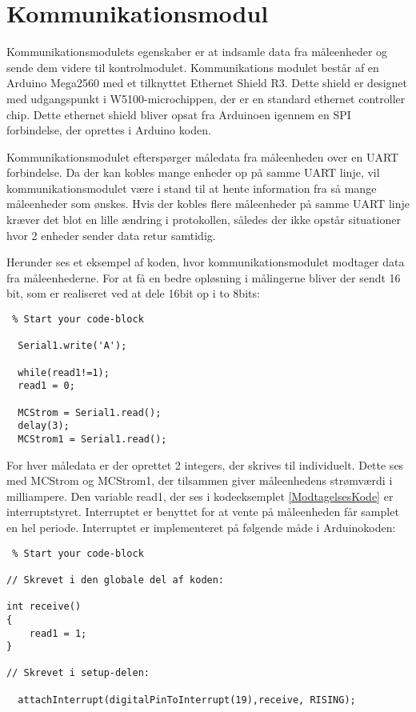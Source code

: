 
\section{Kommunikationsmodul}

Kommunikationsmodulets egenskaber er at indsamle data fra måleenheder og sende dem videre til kontrolmodulet. Kommunikations modulet består af en Arduino Mega2560 med et tilknyttet Ethernet Shield R3. Dette shield er designet med udgangspunkt i W5100-microchippen, der er en standard ethernet controller chip. Dette ethernet shield bliver opsat fra Arduinoen igennem en SPI forbindelse, der oprettes i Arduino koden. 

Kommunikationsmodulet efterspørger måledata fra måleenheden over en UART forbindelse. Da der kan kobles mange enheder op på samme UART linje, vil kommunikationsmodulet være i stand til at hente information fra så mange måleenheder som ønskes. Hvis der kobles flere måleenheder på samme UART linje kræver det blot en lille ændring i protokollen, således der ikke opstår situationer hvor 2 enheder sender data retur samtidig. 


Herunder ses et eksempel af koden, hvor kommunikationsmodulet modtager data fra måleenhederne. For at få en bedre opløsning i målingerne bliver der sendt 16 bit, som er realiseret ved at dele 16bit op i to 8bits: 

\begin{lstlisting} % Start your code-block
  
  Serial1.write('A');
  
  while(read1!=1);
  read1 = 0;
  
  MCStrom = Serial1.read();
  delay(3);
  MCStrom1 = Serial1.read();
\end{lstlisting}


For hver måledata er der oprettet 2 integers, der skrives til individuelt. Dette ses med MCStrom og MCStrom1, der tilsammen giver måleenhedens strømværdi i milliampere. 
Den variable read1, der ses i kodeeksemplet \ref{ModtagelsesKode} er interruptstyret. Interruptet er benyttet for at vente på måleenheden får samplet en hel periode. Interruptet er implementeret på følgende måde i Arduinokoden: 

\begin{lstlisting} % Start your code-block

// Skrevet i den globale del af koden:

int receive()
{
	read1 = 1;
}

// Skrevet i setup-delen:

  attachInterrupt(digitalPinToInterrupt(19),receive, RISING);

\end{lstlisting}


